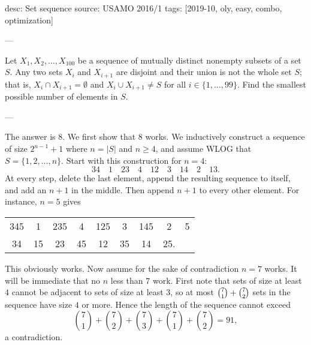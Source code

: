 desc: Set sequence
source: USAMO 2016/1
tags: [2019-10, oly, easy, combo, optimization]

---

Let $X_1,X_2,\ldots,X_{100}$ be a sequence of mutually distinct nonempty subsets of a set $S$. Any two sets $X_i$ and $X_{i+1}$ are disjoint and their union is not the whole set $S$; that is, $X_i\cap X_{i+1}=\emptyset$ and $X_i\cup X_{i+1}\ne S$ for all $i\in\{1,\ldots,99\}$. Find the smallest possible number of elements in $S$.

---

The answer is $8$. We first show that $8$ works. We inductively construct a sequence of size $2^{n-1}+1$ where $n=|S|$ and $n\ge 4$, and assume WLOG that $S=\{1,2,\ldots,n\}$. Start with this construction for $n=4$: \[34\quad1\quad23\quad4\quad12\quad3\quad14\quad2\quad13.\]
At every step, delete the last element, append the resulting sequence to itself, and add an $n+1$ in the middle. Then append $n+1$ to every other element. For instance, $n=5$ gives
\begin{center}
    \begin{tabular}{c c c c c c c c c}
        345&1&235&4&125&3&145&2&5\\
        34&15&23&45&12&35&14&25.&
    \end{tabular}
\end{center}
This obviously works. Now assume for the sake of contradiction $n=7$ works. It will be immediate that no $n$ less than $7$ work. First note that sets of size at least $4$ cannot be adjacent to sets of size at least $3$, so at most $\tbinom71+\tbinom72$ sets in the sequence have size $4$ or more. Hence the length of the sequence cannot exceed \[\binom71+\binom72+\binom73+\binom71+\binom72=91,\]
a contradiction.
